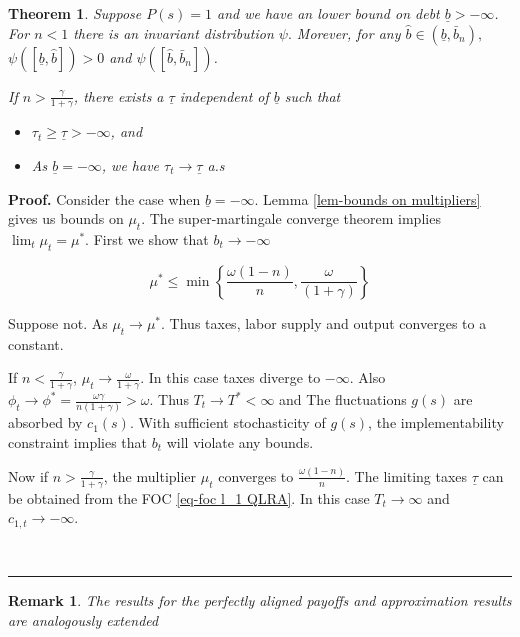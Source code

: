 \documentclass[thmsb,11pt]{article}
\newtheorem{theorem}{Theorem}
\newtheorem{remark}{Remark}
\newenvironment{proof}[1][Proof]{\noindent \textbf{#1.} }{\  \rule{0.5em}{0.5em}}
\begin{document}
\begin{theorem}
 Suppose $P(s)=1$ and we have an lower bound on debt $\underline{b}>-\infty$. For $n<1$ there is an invariant distribution $\psi .$ Morever, for any $\hat{b}\in \left( \underline{b},\bar{b}_n\right) ,$ $\psi \left( \left[ \underline{b},\hat{b}%
\right] \right) >0$ and $\psi \left( \left[ \hat{b},\bar{b}_n\right] \right)$. 

If $n>\frac{\gamma}{1+\gamma}$, there exists a $\underline{\tau}$ independent of $\underline{b}$ such that
 \begin{itemize}
  \item $\tau_t\geq\underline{\tau}>-\infty$, and
  \item As $\underline{b} =-\infty$, we have $\tau_t\to \underline{ \tau}$ a.s
 \end{itemize}

 \end{theorem}

 
 
\begin{proof}
Consider the case when $\underline{b}=-\infty$.   Lemma \ref{lem-bounds on multipliers} gives us bounds on $\mu_t$. The super-martingale converge theorem implies $\lim_t\mu_t=\mu^*$. First we show that $b_t\to-\infty$

\[\mu^* \leq \min \left \{\frac{\omega (1-n)}{n},\frac{\omega }{(1+\gamma)} \right\}\]

Suppose not. As $\mu_t\to \mu^*$. Thus taxes, labor supply and output converges to a constant.  

If $n<\frac{\gamma}{1+\gamma}$, $\mu_t\to\frac{\omega}{1+\gamma}$. In this case taxes diverge to $-\infty$. Also$\phi_t\to \phi^*=\frac{\omega \gamma}{n(1+\gamma)} >\omega$. Thus  $T_t \to T^*<\infty$ and The fluctuations $g(s)$ are absorbed by $c_1(s)$. With sufficient stochasticity of $g(s)$, the implementability constraint implies that $b_t$ will violate any bounds. 

Now if $n>\frac{\gamma}{1+\gamma}$, the multiplier $\mu_t$ converges to $\frac{\omega (1-n)}{n}$. The limiting taxes $\underline{\tau} $ can be obtained from the FOC \eqref{eq-foc l_1 QLRA}. In this case $T_t\to \infty$ and $c_{1,t}\to-\infty$.  

\end{proof}


\begin{remark}
 The results for the perfectly aligned payoffs and approximation results are analogously extended
\end{remark}
\end{document}
